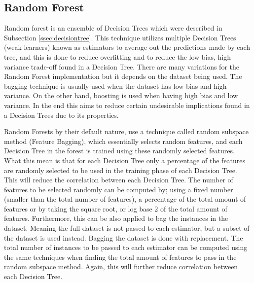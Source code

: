 \subsection{Random Forest}\label{ssec:randomforest}
Random forest is an ensemble of Decision Trees \cite{ho1995random} which were described in Subsection \ref{ssec:decisiontree}. This technique utilizes multiple Decision Trees (weak learners) known as estimators to average out the predictions made by each tree, and this is done to reduce overfitting and to reduce the low bias, high variance trade-off found in a Decision Tree. There are many variations for the Random Forest implementation but it depends on the dataset being used. The bagging technique is usually used when the dataset has low bias and high variance. On the other hand, boosting is used when having high bias and low variance. In the end this aims to reduce certain undesirable implications found in a Decision Trees due to its properties. 

\noindent Random Forests by their default nature, use a technique called random subspace method (Feature Bagging), which essentially selects random features, and each Decision Tree in the forest is trained using these randomly selected features. What this mean is that for each Decision Tree only a percentage of the features are randomly selected to be used in the training phase of each Decision Tree. This will reduce the correlation between each Decision Tree. The number of features to be selected randomly can be computed by; using a fixed number (smaller than the total number of features), a percentage of the total amount of features or by taking the square root, or log base 2 of the total amount of features. Furthermore, this can be also applied to bag the instances in the dataset. Meaning the full dataset is not passed to each estimator, but a subset of the dataset is used instead. Bagging the dataset is done with replacement. The total number of instances to be passed to each estimator can be computed using the same techniques when finding the total amount of features to pass in the random subspace method. Again, this will further reduce correlation between each Decision Tree.  

